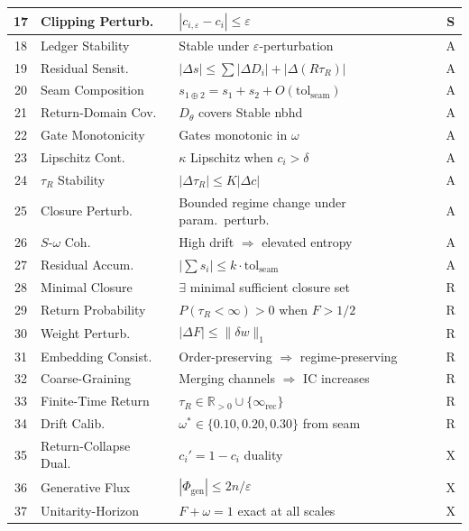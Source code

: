 \documentclass[
  aps,
  prd,
  preprint,
  superscriptaddress,
  nofootinbib,
  floatfix,
  longbibliography
]{revtex4-2}
\newcommand{\tR}{\tau_{\!R}}
\newcommand{\eps}{\varepsilon}
\newcommand{\tolseam}{\mathrm{tol}_{\mathrm{seam}}}
\newcommand{\IC}{\mathrm{IC}}
\newcommand{\Fid}{F}
\newcommand{\Drft}{\omega}
\newcommand{\Ent}{S}
\newcommand{\Logint}{\kappa}
\begin{document}
{\begin{longtable}{@{}cllc@{}}
17 & Clipping Perturb.\  & $|c_{i,\eps} - c_i| \leq \eps$                       & S \\
\midrule
18 & Ledger Stability    & Stable under $\eps$-perturbation                      & A \\
19 & Residual Sensit.\   & $|\Delta s| \leq \sum|\Delta D_i| + |\Delta(R\tR)|$ & A \\
20 & Seam Composition    & $s_{1\oplus 2} = s_1 + s_2 + O(\tolseam)$           & A \\
21 & Return-Domain Cov.\ & $D_\theta$ covers Stable nbhd                        & A \\
22 & Gate Monotonicity   & Gates monotonic in $\Drft$                            & A \\
23 & Lipschitz Cont.\    & $\Logint$ Lipschitz when $c_i > \delta$              & A \\
24 & $\tR$ Stability     & $|\Delta\tR| \leq K|\Delta c|$                      & A \\
25 & Closure Perturb.\   & Bounded regime change under param.\ perturb.          & A \\
26 & $\Ent$-$\Drft$ Coh.\ & High drift $\Rightarrow$ elevated entropy            & A \\
27 & Residual Accum.\    & $|\sum s_i| \leq k\cdot\tolseam$                    & A \\
\midrule
28 & Minimal Closure     & $\exists$ minimal sufficient closure set              & R \\
29 & Return Probability  & $P(\tR < \infty) > 0$ when $\Fid > 1/2$            & R \\
30 & Weight Perturb.\    & $|\Delta\Fid| \leq \|\delta w\|_1$                  & R \\
31 & Embedding Consist.\ & Order-preserving $\Rightarrow$ regime-preserving     & R \\
32 & Coarse-Graining     & Merging channels $\Rightarrow$ $\IC$ increases       & R \\
33 & Finite-Time Return  & $\tR \in \mathbb{R}_{>0} \cup \{\infty_{\mathrm{rec}}\}$ & R \\
34 & Drift Calib.\       & $\Drft^* \in \{0.10, 0.20, 0.30\}$ from seam        & R \\
\midrule
35 & Return-Collapse Dual.\ & $c_i' = 1{-}c_i$ duality                          & X \\
36 & Generative Flux     & $|\Phi_{\mathrm{gen}}| \leq 2n/\eps$                & X \\
37 & Unitarity-Horizon   & $\Fid + \Drft = 1$ exact at all scales              & X \\

\end{longtable}}
\end{document}
